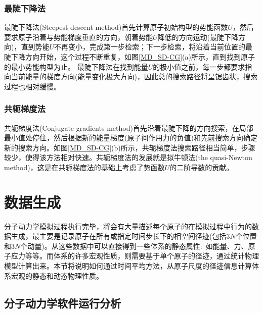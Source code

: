 \subsubsection{最陡下降法}
最陡下降法\textrm{(Steepest-descent method)}首先计算原子初始构型的势能函数$U$，然后要求原子沿着与势能梯度垂直的方向，朝着势能$U$降低的方向运动(最陡下降方向)，直到势能$U$不再变小，完成第一步检索；下一步检索，将沿着当前位置的最陡下降方向开始，这个过程不断重复，如图\ref{MD_SD-CG}\textrm{(a)}所示，直到找到原子的最小势能构型为止。
最陡下降法在找到能量$U$的极小值之前，每一步都要求指向当前能量的梯度方向(能量变化极大方向)，因此总的搜索路径将呈锯齿状，搜索过程也相对缓慢。
\subsubsection{共轭梯度法}
共轭梯度法\textrm{(Conjugate gradients method)}首先沿着最陡下降的方向搜索，在局部最小值处停住，然后根据新的能量梯度(原子间作用力的负值)和先前搜索方向确定新的搜索方向。如图\ref{MD_SD-CG}(b)所示，共轭梯度法搜索路径相当简单，步骤较少，使得该方法相对快速。共轭梯度法的发展就是拟牛顿法\textrm{(the quasi-Newton method)}，这是在共轭梯度法的基础上考虑了势函数$U$的二阶导数的贡献。

\section{数据生成}
分子动力学模拟过程执行完毕，将会有大量描述每个原子的在模拟过程中行为的数据生成，最主要是记录原子在所有或指定时间步长下的相空间径迹(包括3$N$个位置和3$N$个动量)。从这些数据中可以直接得到一些体系的静态属性:~如能量、力、原子应力等等。而体系的许多宏观性质，则需要基于单个原子的径迹，通过统计物理模型计算出来。本节将说明如何通过时间平均方法，从原子尺度的径迹信息计算体系宏观的静态和动态物理性质。
\subsection{分子动力学软件运行分析}
